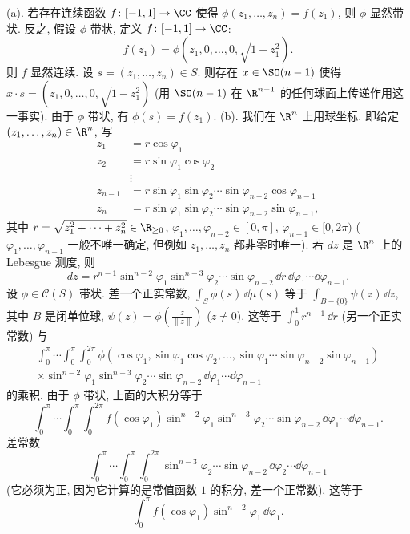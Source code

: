\begin{solution}
(a). 若存在连续函数 $f \colon [-1,1] \to \CC$ 使得 $\phi(z_1, \ldots, z_n) = f(z_1)$, 则 $\phi$ 显然带状.
反之, 假设 $\phi$ 带状, 定义 $f \colon [-1,1] \to \CC$:
\[
f(z_1) = \phi(z_1, 0, \ldots, 0, \sqrt{1-z_1^2}).
\]
则 $f$ 显然连续. 设 $s = (z_1, \ldots, z_n) \in S$. 则存在 $x \in \SO(n-1)$ 使得 $x \cdot s = (z_1, 0, \ldots, 0, \sqrt{1-z_1^2})$ (用 $\SO(n-1)$ 在 $\R^{n-1}$ 的任何球面上传递作用这一事实). 由于 $\phi$ 带状, 有 $\phi(s) = f(z_1)$.
(b). 我们在 $\R^n$ 上用球坐标. 即给定 $(z_1, \ldots, z_n) \in \R^n$, 写
\begin{align*}
z_1 &= r\cos\varphi_1 \\
z_2 &= r\sin\varphi_1\cos\varphi_2 \\
&\vdots \\
z_{n-1} &= r\sin\varphi_1\sin\varphi_2\cdots\sin\varphi_{n-2}\cos\varphi_{n-1} \\
z_n &= r\sin\varphi_1\sin\varphi_2\cdots\sin\varphi_{n-2}\sin\varphi_{n-1},
\end{align*}
其中 $r = \sqrt{z_1^2 + \cdots + z_n^2} \in \R_{\geq 0}$, $\varphi_1, \ldots, \varphi_{n-2} \in [0, \pi]$, $\varphi_{n-1} \in [0, 2\pi)$ ($\varphi_1, \ldots, \varphi_{n-1}$ 一般不唯一确定, 但例如 $z_1, \ldots, z_n$ 都非零时唯一). 若 $dz$ 是 $\R^n$ 上的 Lebesgue 测度, 则
\[
dz = r^{n-1}\sin^{n-2}\varphi_1\sin^{n-3}\varphi_2\cdots\sin\varphi_{n-2}\,\dd r\,\dd\varphi_1\cdots\dd\varphi_{n-1}.
\]
设 $\phi \in \mathcal{C}(S)$ 带状. 差一个正实常数, $\int_S\phi(s)\,\dd\mu(s)$ 等于 $\int_{B-\{0\}}\psi(z)\,\dd z$, 其中 $B$ 是闭单位球, $\psi(z) = \phi(\frac{z}{\|z\|})$ ($z \neq 0$). 这等于 $\int_0^1 r^{n-1}\,\dd r$ (另一个正实常数) 与
\begin{multline*}
\int_0^{\pi}\cdots\int_0^{\pi}\int_0^{2\pi}\phi(\cos\varphi_1, \sin\varphi_1\cos\varphi_2, \ldots, \sin\varphi_1\cdots\sin\varphi_{n-2}\sin\varphi_{n-1}) \\
\times \sin^{n-2}\varphi_1\sin^{n-3}\varphi_2\cdots\sin\varphi_{n-2}\,\dd\varphi_1\cdots\dd\varphi_{n-1}
\end{multline*}
的乘积. 由于 $\phi$ 带状, 上面的大积分等于
\[
\int_0^{\pi}\cdots\int_0^{\pi}\int_0^{2\pi}f(\cos\varphi_1)\sin^{n-2}\varphi_1\sin^{n-3}\varphi_2\cdots\sin\varphi_{n-2}\,\dd\varphi_1\cdots\dd\varphi_{n-1}.
\]
差常数
\[
\int_0^{\pi}\cdots\int_0^{\pi}\int_0^{2\pi}\sin^{n-3}\varphi_2\cdots\sin\varphi_{n-2}\,\dd\varphi_2\cdots\dd\varphi_{n-1}
\]
(它必须为正, 因为它计算的是常值函数 $1$ 的积分, 差一个正常数), 这等于
\[
\int_0^{\pi}f(\cos\varphi_1)\sin^{n-2}\varphi_1\,\dd\varphi_1.
\]
\end{solution}
